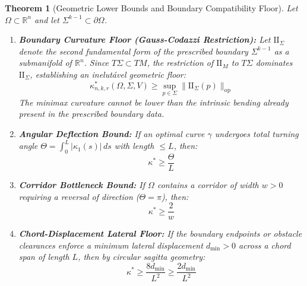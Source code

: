 \documentclass[11pt,reqno]{amsart}
\newtheorem{theorem}{Theorem}[section]
\theoremstyle{definition}
\providecommand{\R}{\mathbb{R}}
\providecommand{\II}{\mathrm{I\!I}}
\newcommand{\op}{\mathrm{op}}
\numberwithin{equation}{section}
\providecommand{\II}{\mathrm{II}}
\providecommand{\R}{\mathbb{R}}
\begin{document}
\begin{theorem}[Geometric Lower Bounds and Boundary Compatibility Floor]
\label{thm:lower_bounds}
Let $\Omega \subset \R^n$ and let $\Sigma^{k-1} \subset \partial\Omega$.
\begin{enumerate}
    \item \textbf{Boundary Curvature Floor (Gauss-Codazzi Restriction):} Let $\II_\Sigma$ denote the second fundamental form of the prescribed boundary $\Sigma^{k-1}$ as a submanifold of $\R^n$. Since $T\Sigma \subset TM$, the restriction of $\II_M$ to $T\Sigma$ dominates $\II_\Sigma$, establishing an inelutável geometric floor:
    \begin{equation}
    \kappa^*_{n,k,r}(\Omega, \Sigma, V) \geq \sup_{p \in \Sigma} \|\II_\Sigma(p)\|_{\op}
    \end{equation}
    The minimax curvature cannot be lower than the intrinsic bending already present in the prescribed boundary data.
    \item \textbf{Angular Deflection Bound:} If an optimal curve $\gamma$ undergoes total turning angle $\Theta = \int_0^L |\kappa_1(s)| \, ds$ with length $\le L$, then:
    \begin{equation}
    \kappa^* \geq \frac{\Theta}{L}
    \end{equation}
    \item \textbf{Corridor Bottleneck Bound:} If $\Omega$ contains a corridor of width $w > 0$ requiring a reversal of direction ($\Theta = \pi$), then:
    \begin{equation}
    \kappa^* \geq \frac{2}{w}
    \end{equation}
    \item \textbf{Chord-Displacement Lateral Floor:} If the boundary endpoints or obstacle clearances enforce a minimum lateral displacement $d_{\min} > 0$ across a chord span of length $L$, then by circular sagitta geometry:
    \begin{equation}
    \kappa^* \geq \frac{8 d_{\min}}{L^2} \geq \frac{2 d_{\min}}{L^2}
    \end{equation}
\end{enumerate}
\end{theorem}
\end{document}

